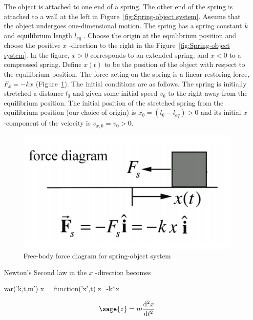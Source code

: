 The object is attached to one end of a spring. The other end of the spring is 
attached to a wall at the left in Figure~\ref{fig:Spring-object system}.
Assume that the object undergoes 
one-dimensional motion. The spring has a spring constant $k$ and equilibrium 
length $l_{eq}$ . Choose the origin at the equilibrium position and choose the 
positive $x$ -direction to the right in the Figure~\ref{fig:Spring-object system}.
In the figure, $x > 0$ 
corresponds to an extended spring, and $x < 0$ to a compressed spring. Define 
$x(t)$ to be the position of the object with respect to the equilibrium 
position. The force acting on the spring is a linear restoring force, $F_{x} = 
−k x$ (Figure~\ref{Free-body force diagram for spring-object system}).
The initial conditions are as follows. The spring is 
initially stretched a distance $l_{0}$ and given some initial speed $v_{0}$ to 
the right away from the equilibrium position. The initial position of the 
stretched spring from the equilibrium position (our choice of origin) is $x_{0} 
= (l_{0}-l_{eq} ) > 0$ and its initial $x$ -component of the velocity is 
$v_{x,0} = v_{0} > 0$. 

\begin{figure}
\begin{center}
        \includegraphics[scale=0.25]{diagram1.png}
\end{center}
\caption{Free-body force diagram for spring-object system}
\label{Free-body force diagram for spring-object system}
\end{figure}

Newton’s Second law in the $x$ -direction becomes

\begin{sagesilent}
var('k,t,m')
x = function('x',t)
z=-k*x
\end{sagesilent}

\begin{equation}
\sage{z} =  m\frac{\mathrm{d}^{2}x}{\mathrm{d}t^{2}}
\label{eq:1}
\end{equation}

